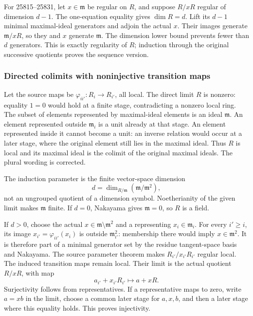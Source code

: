 For 25815--25831, let \(x\in\mathfrak m\) be regular on \(R\), and suppose \(R/xR\) regular of dimension \(d-1\). The one-equation equality gives \(\dim R=d\). Lift its \(d-1\) minimal maximal-ideal generators and adjoin the actual \(x\). Their images generate \(\mathfrak m/xR\), so they and \(x\) generate \(\mathfrak m\). The dimension lower bound prevents fewer than \(d\) generators. This is exactly regularity of \(R\); induction through the original successive quotients proves the sequence version.

\subsubsection{Directed colimits with noninjective transition maps}\label{algebra-proof-020-directed-colimits-with-noninjective-transition-maps}

Let the source maps be \(\varphi_{ii'}:R_i\to R_{i'}\), all local. The direct limit \(R\) is nonzero: equality \(1=0\) would hold at a finite stage, contradicting a nonzero local ring. The subset of elements represented by maximal-ideal elements is an ideal \(\mathfrak m\). An element represented outside \(\mathfrak m_i\) is a unit already at that stage. An element represented inside it cannot become a unit: an inverse relation would occur at a later stage, where the original element still lies in the maximal ideal. Thus \(R\) is local and its maximal ideal is the colimit of the original maximal ideals. The plural wording is corrected.

The induction parameter is the finite vector-space dimension \[
 d=\dim_{R/\mathfrak m}(\mathfrak m/\mathfrak m^2),
\] not an ungrouped quotient of a dimension symbol. Noetherianity of the given limit makes \(\mathfrak m\) finite. If \(d=0\), Nakayama gives \(\mathfrak m=0\), so \(R\) is a field.

If \(d>0\), choose the actual \(x\in\mathfrak m\setminus\mathfrak m^2\) and a representing \(x_i\in\mathfrak m_i\). For every \(i'\ge i\), its image \(x_{i'}=\varphi_{ii'}(x_i)\) is outside \(\mathfrak m_{i'}^2\): membership there would imply \(x\in\mathfrak m^2\). It is therefore part of a minimal generator set by the residue tangent-space basis and Nakayama. The source parameter theorem makes \(R_{i'}/x_{i'}R_{i'}\) regular local. The induced transition maps remain local. Their limit is the actual quotient \(R/xR\), with map \[
 a_{i'}+x_{i'}R_{i'}\longmapsto a+xR.
\] Surjectivity follows from representatives. If a representative maps to zero, write \(a=xb\) in the limit, choose a common later stage for \(a,x,b\), and then a later stage where this equality holds. This proves injectivity.


